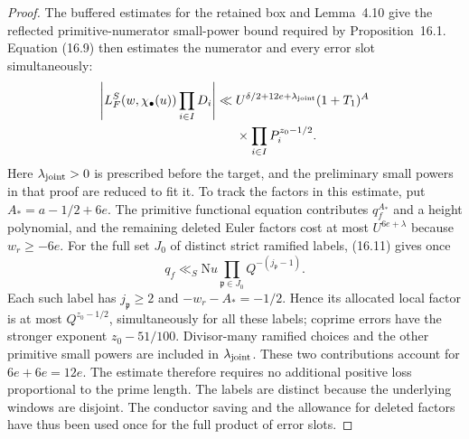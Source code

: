 \documentclass[10pt,reqno,a4paper]{amsart}
\theoremstyle{remark}
\newcommand{\N}{\mathrm N}
\newcommand{\pp}{\mathfrak p}
\begin{document}
\begin{proof}
The buffered estimates for the retained box and Lemma~4.10 give
the reflected primitive-numerator small-power bound required by
Proposition~16.1. Equation (16.9) then estimates the numerator
and every error slot simultaneously:
\begin{equation}\label{joint-errors}
\begin{aligned}
 \left|L_F^S(w,\chi_\bullet(u))\prod_{i\in I}D_i\right|
 \ll{}&U^{\delta/2+12e+\lambda_{\rm joint}}(1+T_1)^A\\
 &\times\prod_{i\in I}P_i^{z_0-1/2}.
\end{aligned}
\end{equation}
Here $\lambda_{\rm joint}>0$ is prescribed before the target,
and the preliminary small powers in that proof are reduced to fit it.
To track the factors in this estimate, put
$A_*=a-1/2+6e$. The primitive functional equation contributes
$q_f^{A_*}$ and a height polynomial, and the remaining deleted Euler
factors cost at most $U^{6e+\lambda}$ because $w_r\ge-6e$.
For the full set $J_0$ of distinct strict ramified labels, (16.11)
gives once
\[
 q_f\ll_S\N u\prod_{\pp\in J_0}Q^{-(j_\pp-1)}.
\]
Each such label has $j_\pp\ge2$ and
$-w_r-A_*=-1/2$. Hence its allocated local factor is at most
$Q^{z_0-1/2}$, simultaneously for all these labels; coprime errors
have the stronger exponent $z_0-51/100$. Divisor-many ramified
choices and the other primitive small powers are included in
$\lambda_{\rm joint}$. These two contributions account for $6e+6e=12e$. The estimate therefore
requires no additional positive loss proportional to the prime length.
The labels are distinct because the underlying windows are disjoint.
The conductor saving and the allowance for deleted factors have thus
been used once for the full product of error slots.


\end{proof}
\end{document}
